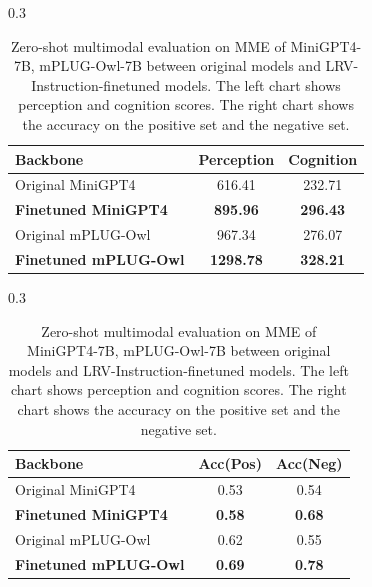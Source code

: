 \vspace{-0.1in}
\begin{table}[t]
\begin{subtable}[t]{0.3\textwidth}
\small
\begin{tabular}{lcc}
\toprule[1.5pt]
Backbone & Perception & Cognition\\
\midrule
Original MiniGPT4 & 616.41 & 232.71 \\
\textbf{Finetuned MiniGPT4} & \textbf{895.96} & \textbf{296.43} \\
Original mPLUG-Owl & 967.34 & 276.07 \\
\textbf{Finetuned mPLUG-Owl} & \textbf{1298.78} & \textbf{328.21} \\
\bottomrule[1.5pt]
\end{tabular}
\label{tab:stat1}
\end{subtable}
\hspace{1.2in}
\begin{subtable}[t]{0.3\textwidth}
\setlength\tabcolsep{4.7pt}
\centering
\small
\begin{tabular}{lcc}
\toprule[1.5pt]
Backbone & Acc(Pos) & Acc(Neg)\\
\midrule
Original MiniGPT4 & 0.53 & 0.54 \\
\textbf{Finetuned MiniGPT4} & \textbf{0.58} & \textbf{0.68} \\
Original mPLUG-Owl & 0.62 & 0.55 \\
\textbf{Finetuned mPLUG-Owl} & \textbf{0.69} & \textbf{0.78} \\
\bottomrule[1.5pt]
\end{tabular}
\label{tab:stat2}
\end{subtable}
\vspace{-2mm}
\caption{Zero-shot multimodal evaluation on MME \citep{fu2023mme} of MiniGPT4-7B, mPLUG-Owl-7B between original models and LRV-Instruction-finetuned models. The left chart shows perception and cognition scores. The right chart shows the accuracy on the positive set and the negative set.
}
\label{tab:MME}
\vspace{-0.05in}
\end{table}

